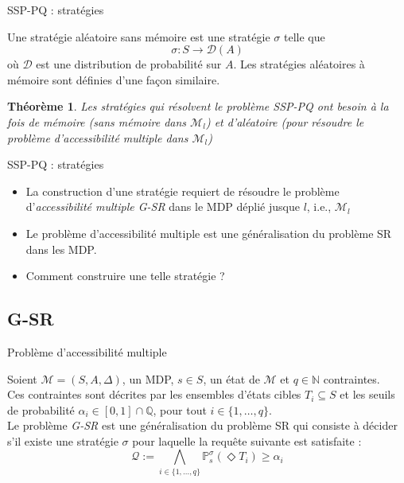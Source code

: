 \documentclass[compress]{beamer}
\theoremstyle{theorem}%
\newtheorem{theoreme}{Théorème}
\begin{document}
\begin{frame}{SSP-PQ : stratégies}
\footnotesize
\begin{definition}
Une stratégie aléatoire sans mémoire est une stratégie $\sigma$ telle que
\[
  \sigma : S \rightarrow \mathcal{D}(A)
\]
où $\mathcal{D}$ est une distribution de probabilité sur $A$.
Les stratégies aléatoires à mémoire sont définies d'une façon similaire.
\end{definition}

\begin{theoreme}
  Les stratégies qui résolvent le problème SSP-PQ ont besoin à la fois de mémoire (sans mémoire dans $\mathcal{M}_{l}$) et d'aléatoire (pour résoudre le problème d'accessibilité multiple  dans $\mathcal{M}_l$)
\end{theoreme}

\end{frame}

\begin{frame}{SSP-PQ : stratégies}
  \begin{itemize}
    \item La construction d'une stratégie requiert de résoudre le problème
    d'\textit{\color{fibeamer@orange}accessibilité multiple  G-SR} dans le MDP déplié jusque $l$, i.e., $\mathcal{M}_l$
    \item Le problème d'accessibilité multiple  est une généralisation du problème SR dans les MDP.
    \item Comment construire une telle stratégie ?
  \end{itemize}
\end{frame}

\subsection{G-SR}

\begin{frame}{Problème d'accessibilité multiple }
  \begin{definition}[G-SR]
  \small
    Soient {\color{fibeamer@orange}$\mathcal{M} = (S, A, \Delta)$}, un MDP, {\color{fibeamer@orange}$s \in S$}, un état de $\mathcal{M}$ et {\color{fibeamer@orange}$q \in \mathbb{N}$
    contraintes}. \\
    Ces contraintes sont décrites par les ensembles d'états cibles
    {\color{fibeamer@orange}$T_i \subseteq S$} et les seuils de probabilité {\color{fibeamer@orange}$\alpha_i \in
    [0, 1] \cap \mathbb{Q}$}, pour tout $i \in \{1, \dots, q\}$. \\
    Le problème \textit{\color{fibeamer@orange}G-SR} est une généralisation du problème SR qui consiste à décider s'il existe une stratégie {\color{fibeamer@orange}$\sigma$} pour laquelle la requête suivante est satisfaite : {\color{fibeamer@orange}
    \[
      \mathcal{Q} := \bigwedge_{i \in \{1, \dots, q\}} \mathbb{P}_s^\sigma(\Diamond T_i) \geq \alpha_i
    \]}
  \end{definition}
\end{frame}
\end{document}
